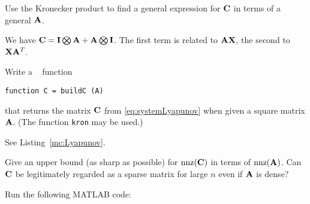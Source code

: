 \begin{problem}
\begin{subproblem}[3]
Use the Kronecker product to find a general expression for ${\mathbf{C}}$ in terms of a general ${\mathbf{A}}$.
\begin{solution}
We have ${\mathbf{C}}=\mathbf{I}\bigotimes
  \mathbf{A}+\mathbf{A}\bigotimes \mathbf{I}$. The first term is related to
  ${\mathbf{A}}{\mathbf{X}}$, the second to ${\mathbf{X}}{\mathbf{A}}^{T}$. 
\end{solution}
\end{subproblem}

\begin{subproblem}[2]
Write a \Matlab~ function 
\begin{center}
  \texttt{function C = buildC (A)}
\end{center}
that returns the matrix ${\mathbf{C}}$ from \eqref{eq:systemLyapunov} when given a square matrix ${\mathbf{A}}$. (The function \texttt{kron} may be used.)
\begin{solution}
See Listing~\ref{mc:Lyapunov}.




\end{solution}
\end{subproblem}

\begin{subproblem}[4]
Give an upper bound (as sharp as possible) for ${\rm nnz}({\mathbf{C}})$ in terms of ${\rm nnz}({\mathbf{A}})$. Can ${\mathbf{C}}$ be legitimately regarded as a sparse matrix for large $n$ even if ${\mathbf{A}}$ is dense?
\begin{hint}
Run the following MATLAB code:


\end{hint}
\end{subproblem}
\end{problem}
